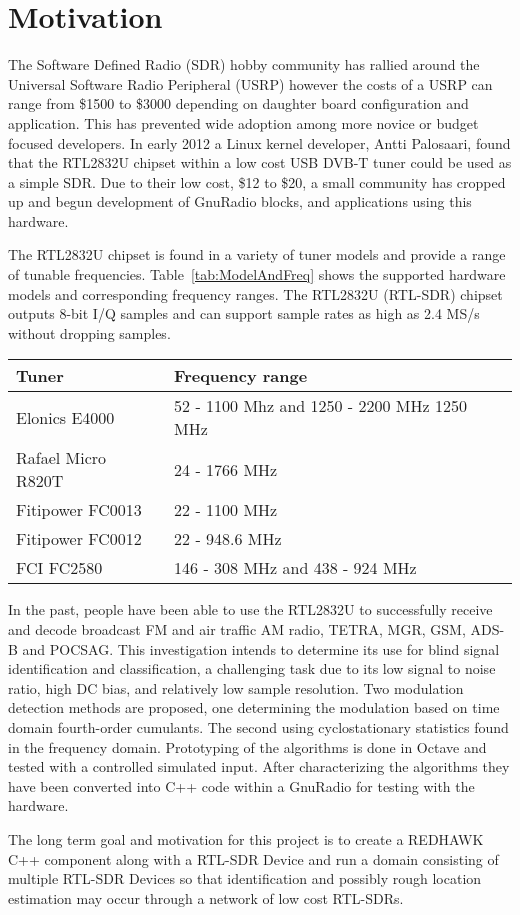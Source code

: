 \section{Motivation}

The Software Defined Radio (SDR) hobby community has rallied around
the Universal Software Radio Peripheral (USRP) however the costs of a USRP can
range from \$1500 to \$3000 depending on daughter board configuration and
application.  This has prevented wide adoption among more novice or budget
focused developers. In early 2012 a Linux kernel developer, Antti Palosaari,
found that the RTL2832U chipset within a low cost USB DVB-T tuner
could be used as a simple SDR.  Due to their low cost, \$12 to \$20, a
small community has cropped up and begun development of GnuRadio blocks, and
applications using this hardware.

The RTL2832U chipset is found in a variety of tuner models and provide a range
of tunable frequencies.
Table~\ref{tab:ModelAndFreq} shows the supported hardware models and
corresponding frequency ranges.  The RTL2832U (RTL-SDR) chipset outputs 8-bit
I/Q samples and can support sample rates as high as 2.4 MS/s without dropping samples.  

\begin{table*}
\centering
\caption{Tuner Model and Frequency Range Supported}
\begin{tabular}{| l | l |} \hline
Tuner	& Frequency range \\ \hline
Elonics E4000	& 52 - 1100 Mhz and 1250 - 2200 MHz 1250 MHz \\ \hline
Rafael Micro R820T &	24 - 1766 MHz \\ \hline
Fitipower FC0013 & 22 - 1100 MHz  \\ \hline
Fitipower FC0012 &	22 - 948.6 MHz \\ \hline
FCI FC2580	& 146 - 308 MHz and 438 - 924 MHz \\ \hline
\end{tabular}
\label{tab:ModelAndFreq}
\end{table*}

In the past, people have been able to use the RTL2832U to successfully
receive and decode broadcast FM and air traffic AM radio, TETRA, MGR, GSM, ADS-B
and POCSAG.  This investigation intends to determine its use for blind signal
identification and classification, a challenging task due to its low signal to
noise ratio, high DC bias, and relatively low sample resolution.  Two
modulation detection methods are proposed, one determining the modulation
based on time domain fourth-order cumulants.  The second using cyclostationary
statistics found in the frequency domain.  Prototyping of the algorithms
is done in Octave and tested with a controlled simulated input. 
After characterizing the algorithms they have been converted into C++ code
within a GnuRadio for testing with the hardware. 

The long term goal and motivation for this project is to create a REDHAWK C++
component along with a RTL-SDR Device and run a domain consisting of multiple
RTL-SDR Devices so that identification and possibly rough location 
estimation may occur through a network of low cost RTL-SDRs.

